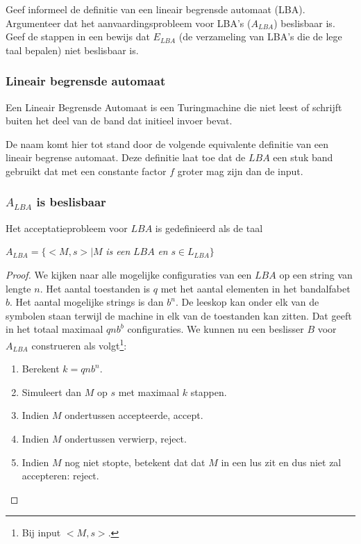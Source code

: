 \begin{question}
	Geef informeel de definitie van een lineair begrensde automaat (LBA). Argumenteer dat het aanvaardingsprobleem voor LBA's ($A_{LBA}$) beslisbaar is. Geef de stappen in een bewijs dat $E_{LBA}$ (de verzameling van LBA's die de lege taal bepalen) niet beslisbaar is.
\end{question}

\subsubsection*{Lineair begrensde automaat}

\begin{theorem}
	Een Lineair Begrensde Automaat is een Turingmachine die niet leest of schrijft buiten het deel van de band dat initieel invoer bevat.
\end{theorem}

De naam komt hier tot stand door de volgende equivalente definitie van een lineair begrense automaat. Deze definitie laat toe dat de $LBA$ een stuk band gebruikt dat met een constante factor $f$ groter mag zijn dan de input.

\subsubsection*{$A_{LBA}$ is beslisbaar}

Het acceptatieprobleem voor $LBA$ is gedefinieerd als de taal
\begin{center}
	$A_{LBA} = \{<M,s>|M$ \textit{is een} $LBA$ \textit{en} $s \in L_{LBA}\}$
\end{center}

\begin{proof}
	We kijken naar alle mogelijke configuraties van een $LBA$ op een string van lengte $n$. Het aantal toestanden is $q$ met het aantal elementen in het bandalfabet $b$. Het aantal mogelijke strings is dan $b^n$. De leeskop kan onder elk van de symbolen staan terwijl de machine in elk van de toestanden kan zitten. Dat geeft in het totaal maximaal $qnb^b$ configuraties.
	We kunnen nu een beslisser $B$ voor $A_{LBA}$ construeren als volgt\footnote{Bij input $<M,s>$.}:
	\begin{enumerate}
		\item Berekent $k=qnb^n$.
		\item Simuleert dan $M$ op $s$ met maximaal $k$ stappen.
		\item Indien $M$ ondertussen accepteerde, accept.
		\item Indien $M$ ondertussen verwierp, reject.
		\item Indien $M$ nog niet stopte, betekent dat dat $M$ in een lus zit en dus niet zal accepteren: reject.
	\end{enumerate}
\end{proof}

